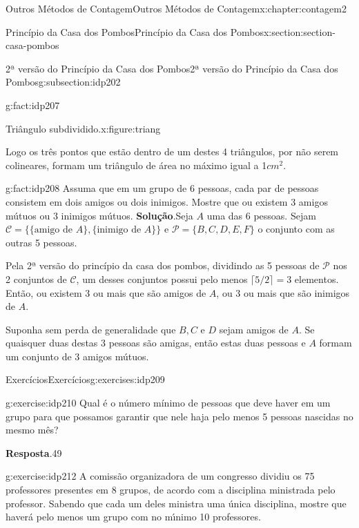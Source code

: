 \documentclass[oneside,10pt,]{book}
\newcommand{\blocktitlefont}{\relax}
\numberwithin{equation}{section}
\begin{document}
\begin{chapterptx}{Outros Métodos de Contagem}{}{Outros Métodos de Contagem}{}{}{x:chapter:contagem2}
\begin{sectionptx}{Princípio da Casa dos Pombos}{}{Princípio da Casa dos Pombos}{}{}{x:section:section-casa-pombos}
\begin{subsectionptx}{2ª versão do Princípio da Casa dos Pombos}{}{2ª versão do Princípio da Casa dos Pombos}{}{}{g:subsection:idp202}
\begin{fact}{}{}{g:fact:idp207}
\begin{figureptx}{Triângulo subdividido.}{x:figure:triang}{}
\begin{image}{0.35}{0.3}{0.35}
\end{image}%
\tcblower
\end{figureptx}%
Logo os três pontos que estão dentro de um destes 4 triângulos, por não serem colineares, formam um triângulo de área no máximo igual a 1\(cm^2\).%
\end{fact}
\begin{fact}{}{}{g:fact:idp208}%
Assuma que em um grupo de 6 pessoas, cada par de pessoas consistem em dois amigos ou dois inimigos. Mostre que ou existem 3 amigos mútuos ou 3 inimigos mútuos.%
\textbf{\blocktitlefont Solução}.\quad{}Seja \(A\) uma das 6 pessoas. Sejam \(\mathcal{C}=\{\{\mbox{amigo de }A\}, \{\mbox{inimigo de }A\}\}\) e \(\mathcal{P} = \{B, C, D, E, F\}\) o conjunto com as outras 5 pessoas.%
\par
Pela 2ª versão do princípio da casa dos pombos, dividindo as 5 pessoas de \(\mathcal{P}\) nos 2 conjuntos de \(\mathcal{C}\), um desses conjuntos possui pelo menos  \(\lceil 5/2 \rceil = 3\) elementos. Então, ou existem 3 ou mais que são amigos de \(A\), ou 3 ou mais que são inimigos de \(A\).%
\par
Suponha sem perda de generalidade que \(B, C\) e \(D\) sejam amigos de \(A\). Se quaisquer duas destas 3 pessoas são amigas, então estas duas pessoas e \(A\) formam um conjunto de 3 amigos mútuos.%
\end{fact}
\end{subsectionptx}
%
%
\typeout{************************************************}
\typeout{************************************************}
%
\begin{exercises-subsection}{Exercícios}{}{Exercícios}{}{}{g:exercises:idp209}
\begin{divisionexercise}{1}{}{}{g:exercise:idp210}%
Qual é o número mínimo de pessoas que deve haver em um grupo para que possamos garantir que nele haja pelo menos 5 pessoas nascidas no mesmo mês?%
\par\smallskip%
\noindent\textbf{\blocktitlefont Resposta}.\hypertarget{g:answer:idp211}{}\quad{}49%
\end{divisionexercise}%
\begin{divisionexercise}{2}{}{}{g:exercise:idp212}%
A comissão organizadora de um congresso dividiu os 75 professores presentes em 8 grupos, de acordo com a disciplina ministrada pelo professor. Sabendo que cada um deles ministra uma única disciplina, mostre que haverá pelo menos um grupo com no mı́nimo 10 professores.%
\end{divisionexercise}%

\end{exercises-subsection}
\end{sectionptx}
\end{chapterptx}
\end{document}
